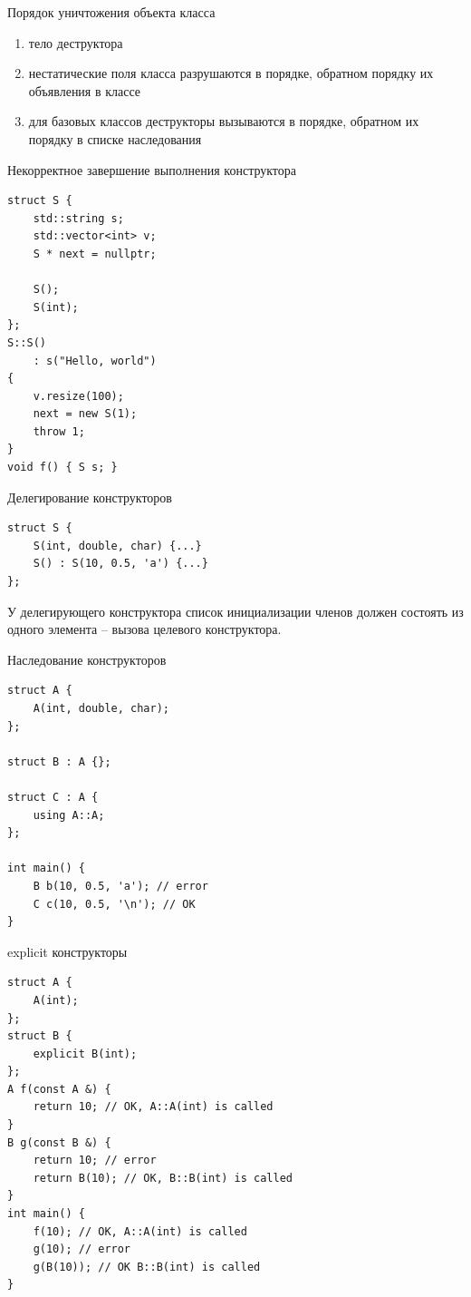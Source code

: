 \documentclass[unknownkeysallowed,xcolor=table]{beamer}
\begin{document}
\begin{frame}{Порядок уничтожения объекта класса}
\begin{enumerate}
  \item тело деструктора \vspace{1em}
  \item нестатические поля класса разрушаются в порядке, обратном порядку их объявления в классе \vspace{1em}
  \item для базовых классов деструкторы вызываются в порядке, обратном их порядку в списке наследования
\end{enumerate}
\end{frame}

\begin{frame}[fragile]{Некорректное завершение выполнения конструктора}
\begin{lstlisting}
struct S {
    std::string s;
    std::vector<int> v;
    S * next = nullptr;
    
    S();
    S(int);
};
S::S()
    : s("Hello, world")
{
    v.resize(100);
    next = new S(1);
    throw 1;
}
void f() { S s; }
\end{lstlisting}
\end{frame}

\begin{frame}[fragile]{Делегирование конструкторов}
\begin{lstlisting}
struct S {
    S(int, double, char) {...}
    S() : S(10, 0.5, 'a') {...}
};
\end{lstlisting}

\vspace{2em}

У делегирующего конструктора список инициализации членов должен состоять из одного элемента -- вызова целевого конструктора.
\end{frame}

\begin{frame}[fragile]{Наследование конструкторов}
\begin{lstlisting}
struct A {
    A(int, double, char);
};

struct B : A {};

struct C : A {
    using A::A;
};

int main() {
    B b(10, 0.5, 'a'); // error
    C c(10, 0.5, '\n'); // OK
}
\end{lstlisting}
\end{frame}

\begin{frame}[fragile]{explicit конструкторы}
\begin{lstlisting}
struct A {
    A(int);
};
struct B {
    explicit B(int);
};
A f(const A &) {
    return 10; // OK, A::A(int) is called
}
B g(const B &) {
    return 10; // error
    return B(10); // OK, B::B(int) is called
}
int main() {
    f(10); // OK, A::A(int) is called
    g(10); // error
    g(B(10)); // OK B::B(int) is called
}
\end{lstlisting}
\end{frame}
\end{document}
